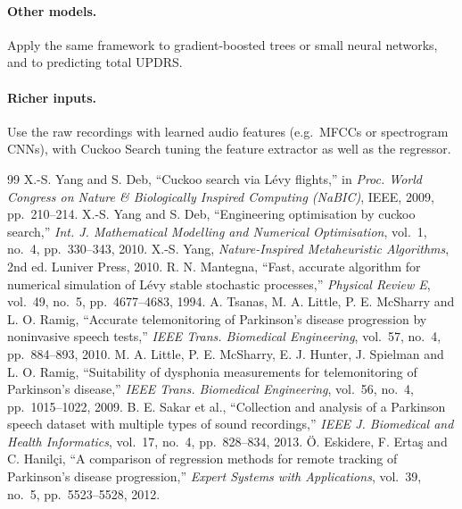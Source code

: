 \documentclass[12pt,a4paper]{article}
\numberwithin{equation}{section}
\numberwithin{table}{section}
\numberwithin{figure}{section}
\begin{document}
\paragraph{Other models.} Apply the same framework to gradient-boosted trees or small neural networks, and to predicting total UPDRS.

\paragraph{Richer inputs.} Use the raw recordings with learned audio features (e.g.\ MFCCs or spectrogram CNNs), with Cuckoo Search tuning the feature extractor as well as the regressor.

\newpage
{}
\begin{thebibliography}{99}
\footnotesize\sloppy\setlength{\itemsep}{1pt}
 X.-S. Yang and S. Deb, ``Cuckoo search via Lévy flights,'' in \emph{Proc. World Congress on Nature \& Biologically Inspired Computing (NaBIC)}, IEEE, 2009, pp.\ 210--214.
 X.-S. Yang and S. Deb, ``Engineering optimisation by cuckoo search,'' \emph{Int. J. Mathematical Modelling and Numerical Optimisation}, vol.\ 1, no.\ 4, pp.\ 330--343, 2010.
 X.-S. Yang, \emph{Nature-Inspired Metaheuristic Algorithms}, 2nd ed. Luniver Press, 2010.
 R. N. Mantegna, ``Fast, accurate algorithm for numerical simulation of Lévy stable stochastic processes,'' \emph{Physical Review E}, vol.\ 49, no.\ 5, pp.\ 4677--4683, 1994.
 A. Tsanas, M. A. Little, P. E. McSharry and L. O. Ramig, ``Accurate telemonitoring of Parkinson's disease progression by noninvasive speech tests,'' \emph{IEEE Trans. Biomedical Engineering}, vol.\ 57, no.\ 4, pp.\ 884--893, 2010.
 M. A. Little, P. E. McSharry, E. J. Hunter, J. Spielman and L. O. Ramig, ``Suitability of dysphonia measurements for telemonitoring of Parkinson's disease,'' \emph{IEEE Trans. Biomedical Engineering}, vol.\ 56, no.\ 4, pp.\ 1015--1022, 2009.
 B. E. Sakar et al., ``Collection and analysis of a Parkinson speech dataset with multiple types of sound recordings,'' \emph{IEEE J. Biomedical and Health Informatics}, vol.\ 17, no.\ 4, pp.\ 828--834, 2013.
 Ö. Eskidere, F. Ertaş and C. Hanilçi, ``A comparison of regression methods for remote tracking of Parkinson's disease progression,'' \emph{Expert Systems with Applications}, vol.\ 39, no.\ 5, pp.\ 5523--5528, 2012.

\end{thebibliography}
\end{document}

